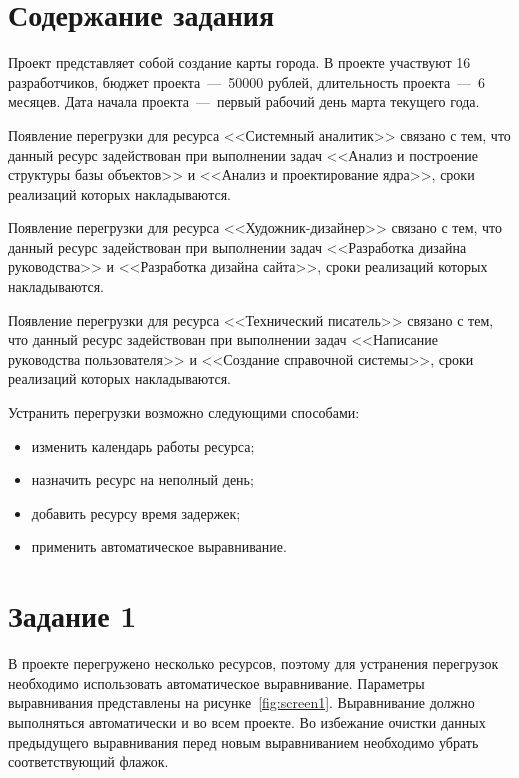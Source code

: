 \setcounter{page}{2}

\section{Содержание задания}
Проект представляет собой создание карты города.
В проекте участвуют 16 разработчиков, бюджет проекта~---~50000 рублей, длительность проекта~---~6 месяцев.
Дата начала проекта~---~первый рабочий день марта текущего года.

Появление перегрузки для ресурса <<Системный аналитик>> связано с тем, что данный ресурс задействован при выполнении задач <<Анализ и построение структуры базы объектов>> и <<Анализ и проектирование ядра>>, сроки реализаций которых накладываются.

Появление перегрузки для ресурса <<Художник-дизайнер>> связано с тем, что данный ресурс задействован при выполнении задач <<Разработка дизайна руководства>> и <<Разработка дизайна сайта>>, сроки реализаций которых накладываются.

Появление перегрузки для ресурса <<Технический писатель>> связано с тем, что данный ресурс задействован при выполнении задач <<Написание руководства пользователя>> и <<Создание справочной системы>>, сроки реализаций которых накладываются.

Устранить перегрузки возможно следующими способами:
\begin{itemize}[label=---]
	\item изменить календарь работы ресурса;
	\item назначить ресурс на неполный день;
	\item добавить ресурсу время задержек;
	\item применить автоматическое выравнивание.
\end{itemize}

\section{Задание 1}

В проекте перегружено несколько ресурсов, поэтому для устранения перегрузок необходимо использовать автоматическое выравнивание.
Параметры выравнивания представлены на рисунке~\ref{fig:screen1}.
Выравнивание должно выполняться автоматически и во всем проекте. Во избежание очистки данных предыдущего выравнивания перед новым выравниванием необходимо убрать соответствующий флажок.

